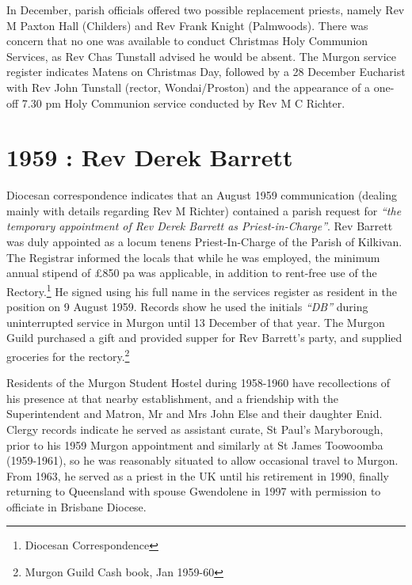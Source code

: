 In December, parish officials offered two possible replacement priests, namely Rev M Paxton Hall (Childers) and Rev Frank Knight (Palmwoods). There was concern that no one was available to conduct Christmas Holy Communion Services, as Rev Chas Tunstall advised he would be absent. The Murgon service register indicates Matens on Christmas Day, followed by a 28 December Eucharist with Rev John Tunstall (rector, Wondai/Proston) and the appearance of a one-off 7.30 pm Holy Communion service conducted by Rev M C Richter.



\section{1959 : Rev Derek Barrett}



Diocesan correspondence indicates that an August 1959 communication (dealing mainly with details regarding Rev M Richter) contained a parish request for \emph{``the temporary appointment of Rev Derek Barrett as Priest-in-Charge''}. Rev Barrett was duly appointed as a locum tenens Priest-In-Charge of the Parish of Kilkivan. The Registrar informed the locals that while he was employed, the minimum annual stipend of \pounds850 pa was applicable, in addition to rent-free use of the Rectory.\footnote{Diocesan Correspondence} He signed using his full name in the services register as resident in the position on 9 August 1959. Records show he used the initials \emph{``DB''} during uninterrupted service in Murgon until 13 December of that year. The Murgon Guild purchased a gift and provided supper for Rev Barrett's party, and supplied groceries for the rectory.\footnote{Murgon Guild Cash book, Jan 1959-60}


Residents of the Murgon Student Hostel during 1958-1960 have recollections of his presence at that nearby establishment, and a friendship with the Superintendent and Matron, Mr and Mrs John Else and their daughter Enid. Clergy records indicate he served as assistant curate, St Paul's Maryborough, prior to his 1959 Murgon appointment and similarly at St James Toowoomba (1959-1961), so he was reasonably situated to allow occasional travel to Murgon. From 1963, he served as a priest in the UK until his retirement in 1990, finally returning to Queensland with spouse Gwendolene in 1997 with permission to officiate in Brisbane Diocese.



\balance



